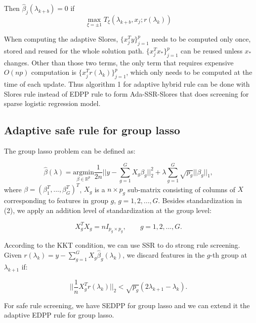 \begin{theorem}
Then $\hat{\beta}_j(\lambda_{k+b})=0$ if
        \begin{equation}
            \max_{\xi=\pm1} T_\xi(\lambda_{k+b},x_j;r(\lambda_k))
        \end{equation}
\end{theorem}

When computing the adaptive Slores, $\{x_j^Ty\}_{j=1}^p$ needs to be computed only once, stored and reused for the whole solution path. $\{x_j^Tx_*\}_{j=1}^p$ can be reused unless $x_*$ changes. Other than those two terms, the only term that requires expensive $O(np)$ computation is $\{x_j^Tr(\lambda_k)\}_{j=1}^p$, which only needs to be computed at the time of each update. Thus algorithm 1 for adaptive hybrid rule can be done with Slores rule instead of EDPP rule to form Ada-SSR-Slores that does screening for sparse logistic regression model.

\subsection{Adaptive safe rule for group lasso}

The group lasso problem \citep{yuan2006model} can be defined as:

\begin{equation}
    \hat{\beta}(\lambda) = \underset{\beta\in \mathbb{R}^p}{\mathrm{argmin}}\frac{1}{2n}\bigg|\bigg|y-\sum_{g=1}^GX_g\beta_g\bigg|\bigg|_2^2+\lambda\sum_{g=1}^G\sqrt{p_g}||\beta_g||_1,
\end{equation}
where $\beta=(\beta_1^T,...,\beta_G^T)^T$, $X_g$ is a $n\times p_g$ sub-matrix consisting of columns of $X$ corresponding to features in group $g$, $g=1,2,...,G$. Besides standardization in (2), we apply an addition level of standardization at the group level\citep{breheny2015group}:

\begin{equation}
    X_g^TX_g=nI_{p_g\times p_g},\qquad g=1,2,...,G.
\end{equation}

According to the KKT condition, we can use SSR to do strong rule screening. Given $r(\lambda_k)=y-\sum_{g=1}^GX_g\hat{\beta}_g(\lambda_k)$, we discard features in the $g$-th group at $\lambda_{k+1}$ if:

\begin{equation}
    \bigg|\bigg|\frac{1}{n}X_g^Tr(\lambda_k)\bigg|\bigg|_2<\sqrt{p_g}(2\lambda_{k+1}-\lambda_k).
\end{equation}

For safe rule screening, we have SEDPP for group lasso\citep{wang2013lasso} and we can extend it the adaptive EDPP rule for group lasso.

